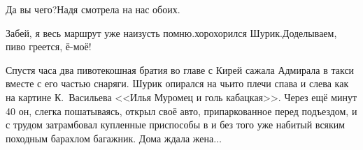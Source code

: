 \diagdash Да вы чего?\mdash Надя смотрела на нас обоих.

\diagdash Забей, я весь маршрут уже наизусть помню.\mdash хорохорился Шурик.\mdash Доделываем, пиво греется, ё-моё!

Спустя часа два пивотекошная братия во главе с Кирей сажала Адмирала в такси вместе с его частью снаряги. Шурик опирался на чьи\sdash то плечи спава и слева как на картине К.~Васильева <<Илья Муромец и голь кабацкая>>. Через ещё минут 40 он, слегка пошатываясь, открыл своё авто, припаркованное перед подъездом, и с трудом затрамбовал купленные приспособы в и без того уже набитый всяким походным барахлом багажник. Дома ждала жена$\ldots$

\begin{center}
\end{center}
